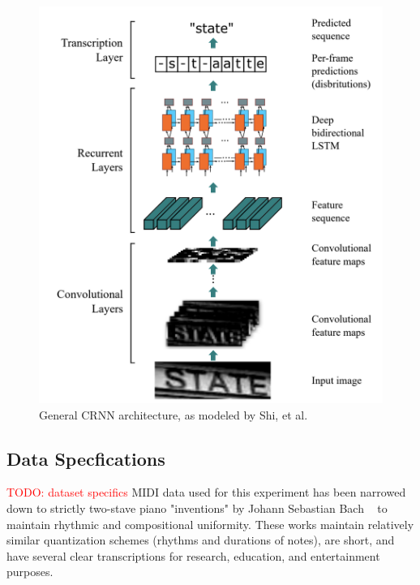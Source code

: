 \documentclass[review,sigconf]{acmart}
\newcommand{\todo}[1]{\textcolor{red}{TODO: #1}}
\begin{document}
\begin{figure}
	\centering
	\includegraphics[width = .8\linewidth]{./figures/crnn_arch.png}
	\caption{General CRNN architecture, as modeled by Shi, et al. ~\cite{shi2015endtoend}}
	\label{fig:crnn-arch}
\end{figure}

\subsection{Data Specfications}
\todo{dataset specifics}
MIDI data used for this experiment has been narrowed down to strictly two-stave piano "inventions" by Johann Sebastian Bach ~\cite{bach_midi} to maintain rhythmic and compositional uniformity.
These works maintain relatively similar quantization schemes (rhythms and durations of notes), are short, and have several clear transcriptions for research, education, and entertainment purposes.
\end{document}
